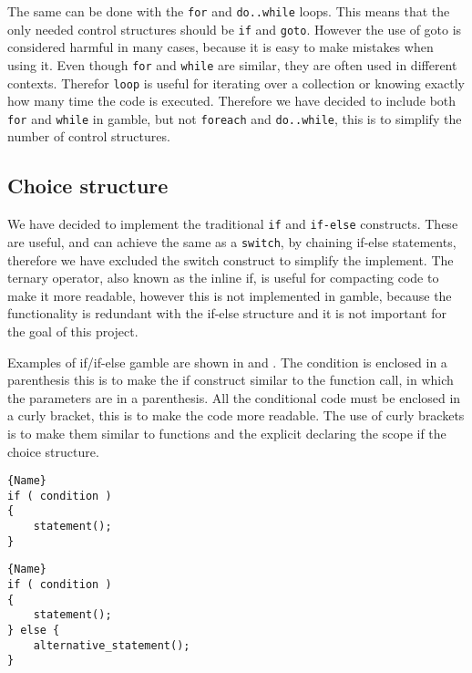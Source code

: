 The same can be done with the \texttt{for} and \texttt{do..while} loops. 
This means that the only needed control structures should be \texttt{if} and \texttt{goto}. 
However the use of goto is considered harmful in many cases, because it is easy to make mistakes when using it. \citep{DijkstraGoto}
Even though \texttt{for} and \texttt{while} are similar, they are often used in different contexts.
Therefor \texttt{loop} is useful for iterating over a collection or knowing exactly how many time the code is executed. 
Therefore we have decided to include both \texttt{for} and \texttt{while} in \gls{gamble}, but not \texttt{foreach} and \texttt{do..while}, this is to simplify the number of control structures.

\subsection{Choice structure}
We have decided to implement the traditional \texttt{if} and \texttt{if-else} constructs. 
These are useful, and can achieve the same as a \texttt{switch}, by chaining if-else statements, therefore we have excluded the switch construct to simplify the implement. 
The ternary operator, also known as the inline if, is useful for compacting code to make it more readable, however this is not implemented in \gls{gamble}, because the functionality is redundant with the if-else structure and it is not important for the goal of this project.

Examples of if/if-else \gls{gamble} are shown in  and . 
The condition is enclosed in a parenthesis this is to make the if construct similar to the function call, in which the parameters are in a parenthesis. 
All the conditional code must be enclosed in a curly bracket, this is to make the code more readable. 
The use of curly brackets is to make them similar to functions and the explicit declaring the scope if the choice structure.

\noindent\begin{minipage}{.45\textwidth}
\begin{lstlisting}[caption=An if construct in \gls{gamble}.,frame=tlrb, label=iflst, numbers=none]{Name}
if ( condition )
{
    statement();
}
\end{lstlisting}
\end{minipage}\hfill
\begin{minipage}{.45\textwidth}
\begin{lstlisting}[caption=An if-else construct in \gls{gamble}.,frame=tlrb, label=ifelselst, numbers=none]{Name}
if ( condition )
{
    statement();
} else {
    alternative_statement();
}
\end{lstlisting}
\end{minipage}


